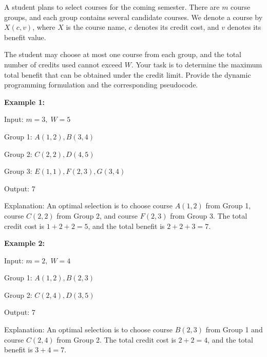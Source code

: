 \problem{}
A student plans to select courses for the coming semester. There are \(m\) course groups, and each group contains several candidate courses.  
We denote a course by \(X(c,v)\), where \(X\) is the course name, \(c\) denotes its credit cost, and \(v\) denotes its benefit value.

The student may choose at most one course from each group, and the total number of credits used cannot exceed \(W\). Your task is to determine the maximum total benefit that can be obtained under the credit limit. Provide the dynamic programming formulation and the corresponding pseudocode.

\textbf{Example 1:}

Input: \(m=3,\; W=5\)

Group 1: \(A(1,2), B(3,4)\)  

Group 2: \(C(2,2), D(4,5)\)  

Group 3: \(E(1,1), F(2,3), G(3,4)\)

Output: \(7\)

Explanation:  
An optimal selection is to choose course \(A(1,2)\) from Group 1, course \(C(2,2)\) from Group 2, and course \(F(2,3)\) from Group 3. The total credit cost is \(1+2+2=5\), and the total benefit is \(2+2+3=7\).

\textbf{Example 2:}

Input: \(m=2,\; W=4\)

Group 1: \(A(1,2), B(2,3)\)  

Group 2: \(C(2,4), D(3,5)\)

Output: \(7\)

Explanation:  
An optimal selection is to choose course \(B(2,3)\) from Group 1 and course \(C(2,4)\) from Group 2. The total credit cost is \(2+2=4\), and the total benefit is \(3+4=7\).

\solution{
}
\newpage